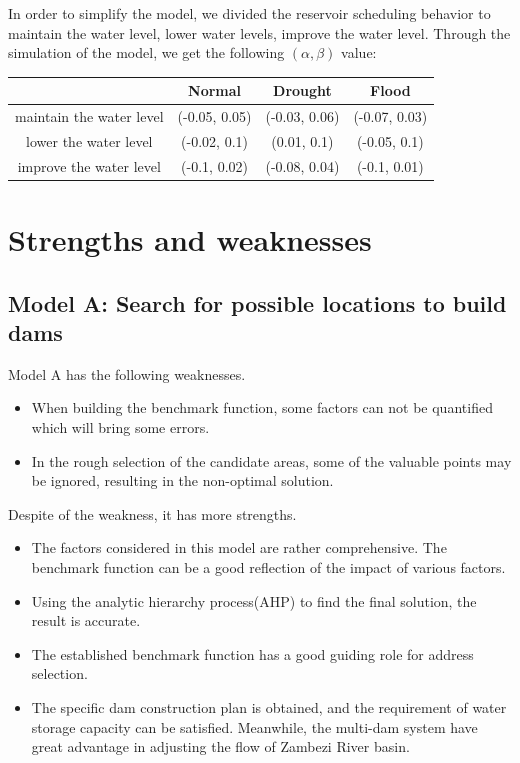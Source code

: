 \documentclass{mcmthesis}
\begin{document}
In order to simplify the model, we divided the reservoir scheduling behavior to maintain the water level, lower water levels, improve the water level. Through the simulation of the model, we get the following $ (\alpha, \beta) $ value:

\begin{table}[!hbp]
\centering
\begin{tabular}{|c|c|c|c|}
\hline
  & Normal & Drought & Flood \\
\hline
maintain the water level& (-0.05, 0.05) & (-0.03, 0.06) & (-0.07, 0.03) \\
\hline
lower the water level& (-0.02, 0.1) & (0.01, 0.1) & (-0.05, 0.1)  \\
\hline
improve the water level& (-0.1, 0.02) & (-0.08, 0.04) & (-0.1, 0.01) \\
\hline
\end{tabular}
\end{table}


\section{Strengths and weaknesses}
\subsection{Model A: Search for possible locations to build dams}
Model A has the following weaknesses.
\begin{itemize}
\item When building the benchmark function, some factors can not be quantified which will bring some errors.
\item In the rough selection of the candidate areas, some of the valuable points may be ignored, resulting in the non-optimal solution.
\end{itemize}
Despite of the weakness, it has more strengths.
\begin{itemize}
  \item The factors considered in this model are rather comprehensive. The benchmark function can be a good reflection of the impact of various factors.
  \item Using the analytic hierarchy process(AHP) to find the final solution, the result is accurate.
  \item The established benchmark function has a good guiding role for address selection.
  \item The specific dam construction plan is obtained, and the requirement of water storage capacity can be satisfied. Meanwhile, the multi-dam system have great advantage in adjusting the flow of Zambezi River basin.
\end{itemize}
\end{document}
